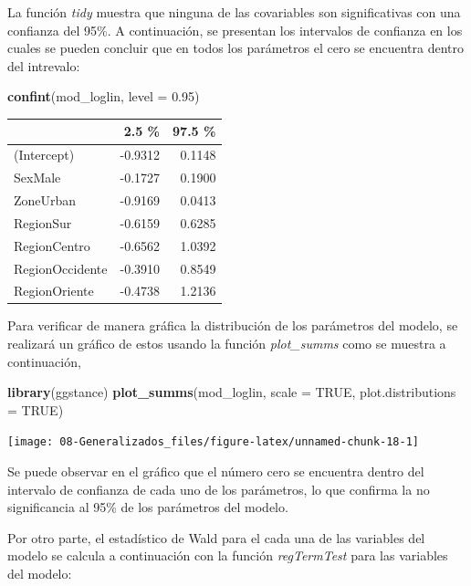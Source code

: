 \documentclass[
  spanish,
  12pt,
]{book}
\newenvironment{Shaded}{\begin{snugshade}}{\end{snugshade}}
\newcommand{\AttributeTok}[1]{\textcolor[rgb]{0.13,0.29,0.53}{#1}}
\newcommand{\ConstantTok}[1]{\textcolor[rgb]{0.56,0.35,0.01}{#1}}
\newcommand{\FloatTok}[1]{\textcolor[rgb]{0.00,0.00,0.81}{#1}}
\newcommand{\FunctionTok}[1]{\textcolor[rgb]{0.13,0.29,0.53}{\textbf{#1}}}
\newcommand{\NormalTok}[1]{#1}
\begin{document}
La función \emph{tidy} muestra que ninguna de las covariables son significativas con una confianza del 95\%. A continuación, se presentan los intervalos de confianza en los cuales se pueden concluir que en todos los parámetros el cero se encuentra dentro del intrevalo:

\begin{Shaded}
\begin{Highlighting}[]
\FunctionTok{confint}\NormalTok{(mod\_loglin, }\AttributeTok{level =} \FloatTok{0.95}\NormalTok{) }
\end{Highlighting}
\end{Shaded}

\begin{tabular}{l|r|r}
\hline
  & 2.5 \% & 97.5 \%\\
\hline
(Intercept) & -0.9312 & 0.1148\\
\hline
SexMale & -0.1727 & 0.1900\\
\hline
ZoneUrban & -0.9169 & 0.0413\\
\hline
RegionSur & -0.6159 & 0.6285\\
\hline
RegionCentro & -0.6562 & 1.0392\\
\hline
RegionOccidente & -0.3910 & 0.8549\\
\hline
RegionOriente & -0.4738 & 1.2136\\
\hline
\end{tabular}

Para verificar de manera gráfica la distribución de los parámetros del modelo, se realizará un gráfico de estos usando la función \emph{plot\_summs} como se muestra a continuación,

\begin{Shaded}
\begin{Highlighting}[]
\FunctionTok{library}\NormalTok{(ggstance)}
\FunctionTok{plot\_summs}\NormalTok{(mod\_loglin, }
             \AttributeTok{scale =} \ConstantTok{TRUE}\NormalTok{, }\AttributeTok{plot.distributions =} \ConstantTok{TRUE}\NormalTok{)}
\end{Highlighting}
\end{Shaded}

\texttt{[image: 08-Generalizados\_files/figure-latex/unnamed-chunk-18-1]}

Se puede observar en el gráfico que el número cero se encuentra dentro del intervalo de confianza de cada uno de los parámetros, lo que confirma la no significancia al 95\% de los parámetros del modelo.

Por otro parte, el estadístico de Wald para el cada una de las variables del modelo se calcula a continuación con la función \emph{regTermTest} para las variables del modelo:
\end{document}
